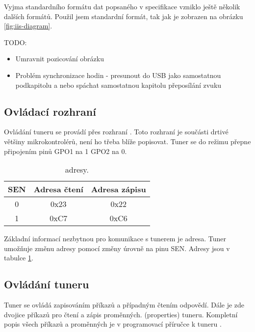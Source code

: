 
Vyjma standardního formátu dat popsaného v \iis specifikace \cite{iis} vzniklo ještě několik dalších formátů. Použil jsem standardní formát, tak jak je zobrazen na obrázku \ref{fig:iis-diagram}.

TODO:
\begin{itemize}
\item Umravnit pozicování obrázku
\item Problém synchronizace hodin - presunout do USB jako samostatnou podkapitolu a nebo spáchat samostatnou kapitolu přeposílání zvuku
\end{itemize}


\subsection{Ovládací rozhraní \iic}
Ovládání tuneru se provádí přes rozhraní \iic. Toto rozhraní je součásti drtivé většiny mikrokontrolérů, není ho třeba blíže popisovat. Tuner se do režimu \iic přepne připojením pinů GPO1 na 1 GPO2 na 0.

\begin{table}[ht!]
\begin{center}
\begin{tabular}{|c|c|c|}
\hline 
SEN & Adresa čtení & Adresa zápisu  \\ 
\hline 
0 & 0x23 & 0x22 \\ 
\hline 
1 & 0xC7 & 0xC6 \\ 
\hline 
\end{tabular}
\end{center}
\caption{\iic adresy.}
\label{tab:iic_addresses} 
\end{table}

Základní informací nezbytnou pro komunikace s tunerem je \iic adresa. Tuner umožňuje změnu adresy pomocí změny úrovně na pinu SEN. Adresy jsou v tabulce \ref{tab:iic_addresses}.

\subsection{Ovládání tuneru}
\label{subsec:tuner-control}
Tuner se ovládá zapisováním příkazů a případným čtením odpovědí. Dále je zde dvojice příkazů pro čtení a zápis proměnných. (properties) tuneru. Kompletní popis všech příkazů a proměnných je v programovací příručce k tuneru \cite{tuner-programing}.

